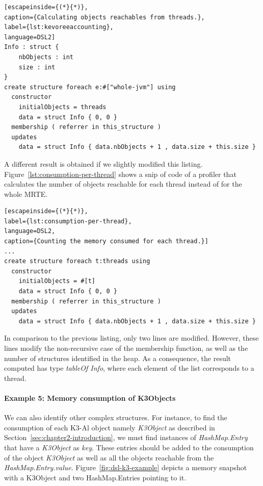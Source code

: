 \begin{lstlisting}[escapeinside={(*}{*)},
caption={Calculating objects reachables from threads.},
label={lst:kevoreeaccounting},
language=DSL2]
Info : struct {
	nbObjects : int
	size : int	
}
create structure foreach e:#["whole-jvm"] using
  constructor
    initialObjects = threads
    data = struct Info { 0, 0 }
  membership ( referrer in this_structure )
  updates 
	data = struct Info { data.nbObjects + 1 , data.size + this.size }
\end{lstlisting}

A different result is obtained if we slightly modified this listing.
Figure~\ref{lst:consumption-per-thread} shows a snip of code of a profiler that calculates the number of objects reachable for each thread instead of for the whole MRTE.
\begin{lstlisting}[escapeinside={(*}{*)},
label={lst:consumption-per-thread},
language=DSL2,
caption={Counting the memory consumed for each thread.}]
...
create structure foreach t:threads using
  constructor
    initialObjects = #[t]
    data = struct Info { 0, 0 }
  membership ( referrer in this_structure )
  updates 
	data = struct Info { data.nbObjects + 1 , data.size + this.size }
\end{lstlisting}

In comparison to the previous listing, only two lines are modified.
However, these lines modify the non-recursive case of the membership function, as well as the number of structures identified in the heap.
As a consequence, the result computed has type \textit{tableOf Info}, where each element of the list corresponds to a thread.

\paragraph{Example 5: Memory consumption of K3Objects}
We can also identify other complex structures.
For instance, to find the consumption of each K3-Al object namely \textit{K3Object} as described in Section~\ref{sec:chapter2-introduction}, we must find instances of \textit{HashMap.Entry} that have a \textit{K3Object} as \textit{key}.
These entries should be added to the consumption of the object \textit{K3Object} as well as all the objects reachable from the \textit{HashMap.Entry.value}.
Figure~\ref{fig:dsl-k3-example} depicts a memory snapshot with a K3Object and two HashMap.Entries pointing to it.

